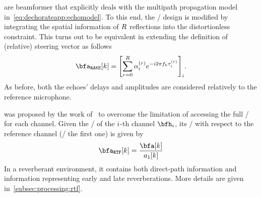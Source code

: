  are beamformer that explicitly deals with the multipath propagation model in~\cref{eq:dechorateapp:echomodel}.
To this end, the \MVDR/ design is modified by integrating the spatial information of $R$ reflections into the distortionless constraint.
This turns out to be equivalent in extending the definition of (relative) steering vector as follows
\begin{equation}
    \bfa_{\mathtt{RAKE}}[k] = \kbracket{ \sum_{\idxEch=0}^{\numEchs} \alpha_{\idxMic}^{(r)} \cste^{-\csti 2 \pi f_k \tau_i^{(r)}} }_i
    .
\end{equation}
As before, both the echoes' delays and amplitudes are considered relatively to the reference microphone.

 was proposed by the work of~ to overcome the limitation of accessing the full \RTFs/ for each channel.
Given the \RTF/ of the $i$-th channel $\bfh_\idxMic$, its \ReTF/ with respect to the reference channel (\eg/ the first one) is given by
\begin{equation}
    \bfa_{\mathtt{RTF}}[k] = \frac{\bfa[k]}{a_1[k]}
\end{equation}
In a reverberant environment, it contains both direct-path information and information representing early and late reverberations.
More details are given in~\cref{subsec:processing:rtf}.

